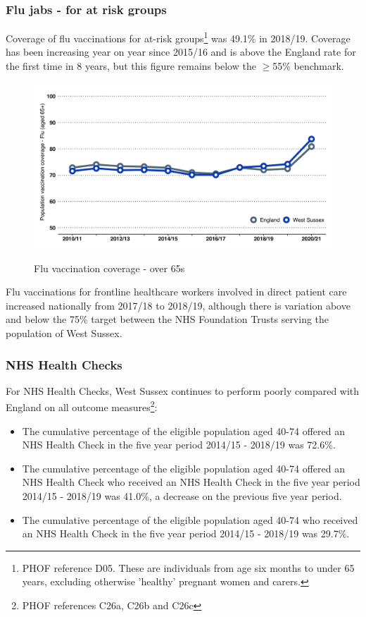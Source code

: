 \subsubsection{Flu jabs - for at risk groups} Coverage of flu vaccinations for at-risk groups\footnote{PHOF reference D05. These are individuals from age six months to under 65 years, excluding otherwise 'healthy' pregnant women and carers.} was 49.1\% in 2018/19. Coverage has been increasing year on year since 2015/16 and is above the England rate for the first time in 8 years, but this figure remains below the $\geq$55\% benchmark.

\begin{figure}[htp]
    \caption{Flu vaccination coverage - over 65s}
    \centering
    \includegraphics[width=\linewidth]{images/65over_vaccine_flu.png}
    \label{fig:flu_vax_coverage}
\end{figure}

Flu vaccinations for frontline healthcare workers involved in direct patient care increased nationally from 2017/18 to 2018/19, although there is variation above and below the 75\% target between the NHS Foundation Trusts serving the population of West Sussex.

\subsubsection{NHS Health Checks} For NHS Health Checks, West Sussex continues to perform poorly compared with England on all outcome measures\footnote{PHOF references C26a, C26b and C26c}:

\begin{itemize}[noitemsep]
    \item The cumulative percentage of the eligible population aged 40-74 offered an NHS Health Check in the five year period 2014/15 - 2018/19 was 72.6\%.
    \item The cumulative percentage of the eligible population aged 40-74 offered an NHS Health Check who received an NHS Health Check in the five year period 2014/15 - 2018/19 was 41.0\%, a decrease on the previous five year period.
    \item The cumulative percentage of the eligible population aged 40-74 who received an NHS Health Check in the five year period 2014/15 - 2018/19 was 29.7\%.
\end{itemize}


